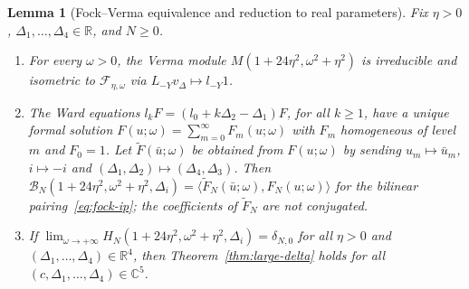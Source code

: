 \documentclass[twoside,10pt]{article}
\numberwithin{equation}{section}
\theoremstyle{slbody}
\newtheorem{lemma}[theorem]{Lemma}
\theoremstyle{definition}
\theoremstyle{remark}
\begin{document}
\begin{lemma}[Fock--Verma equivalence and reduction to real parameters]\label{lem:fock-verma}
Fix \(\eta>0\), \(\Delta_1,\dots,\Delta_4\in\mathbb R\), and \(N\geq0\).
\begin{enumerate}\setlength{\itemsep}{1pt}\setlength{\topsep}{3pt}
\item[(i)] For every \(\omega>0\), the Verma module
  \(M(1+24\eta^2,\omega^2+\eta^2)\) is irreducible and isometric to
  \(\mathcal F_{\eta,\omega}\) via \(L_{-Y}v_\Delta\mapsto l_{-Y}1\).
\item[(ii)] The Ward equations \(l_k F=(l_0+k\Delta_2-\Delta_1)F\), for all
  \(k\geq1\), have a unique formal solution
  \(F(u;\omega)=\sum_{m=0}^\infty F_m(u;\omega)\) with \(F_m\) homogeneous
  of level \(m\) and \(F_0=1\).  Let \(\widetilde F(\bar u;\omega)\) be
  obtained from \(F(u;\omega)\) by sending \(u_m\mapsto\bar u_m\),
  \(i\mapsto-i\) and \((\Delta_1,\Delta_2)\mapsto(\Delta_4,\Delta_3)\).  Then
  \(\mathcal B_N(1+24\eta^2,\omega^2+\eta^2,\Delta_i)
  =\langle\widetilde F_N(\bar u;\omega),F_N(u;\omega)\rangle\) for the
  bilinear pairing~\eqref{eq:fock-ip}; the coefficients of
  \(\widetilde F_N\) are not conjugated.
\item[(iii)] If \(\lim_{\omega\to+\infty}H_N(1+24\eta^2,\omega^2+\eta^2,\Delta_i)=\delta_{N,0}\)
  for all \(\eta>0\) and \((\Delta_1,\dots,\Delta_4)\in\mathbb R^4\), then
  Theorem~\ref{thm:large-delta} holds for all
  \((c,\Delta_1,\dots,\Delta_4)\in\mathbb C^5\).
\end{enumerate}
\end{lemma}
\end{document}
